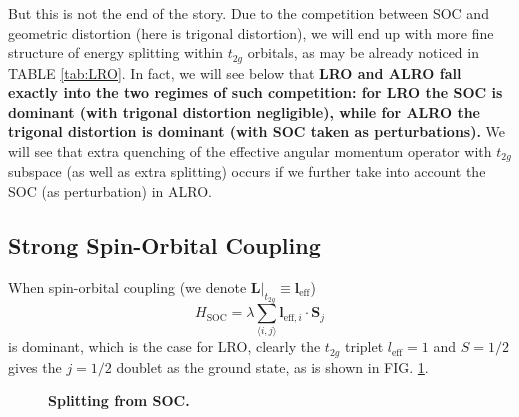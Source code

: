 \documentclass[10pt,nofootinbib,letterpaper]{revtex4}
\begin{document}
		But this is not the end of the story. Due to the competition between SOC and geometric distortion (here is trigonal distortion), we will end up with more fine structure of energy splitting within $t_{2g}$ orbitals, as may be already noticed in TABLE \ref{tab:LRO}. In fact, we will see below that \textbf{LRO and ALRO fall exactly into the two regimes of such competition: for LRO the SOC is dominant (with trigonal distortion negligible), while for ALRO the trigonal distortion is dominant (with SOC taken as perturbations).} We will see that extra quenching of the effective angular momentum operator with $t_{2g}$ subspace (as well as extra splitting) occurs if we further take into account the SOC (as perturbation) in ALRO.
	
	\subsection{Strong Spin-Orbital Coupling}
		When spin-orbital coupling (we denote $\bm{L}|_{t_{2g}}\equiv\bm{l}_{\text{eff}}$)
		\begin{equation}\label{1.2.1}
			H_{\text{SOC}}=\lambda\sum_{\langle i,j\rangle}\bm{l}_{\text{eff},i}\cdot\bm{S}_j
		\end{equation}
		is dominant, which is the case for LRO, clearly the $t_{2g}$ triplet $l_{\text{eff}}=1$ and $S=1/2$ gives the $j=1/2$ doublet as the ground state, as is shown in FIG. \ref{fig:t2g-SOC}.
		\begin{figure}[!htp]
			\centering
			\caption{\bf Splitting from SOC.}
			\label{fig:t2g-SOC}
		\end{figure}
\end{document}
